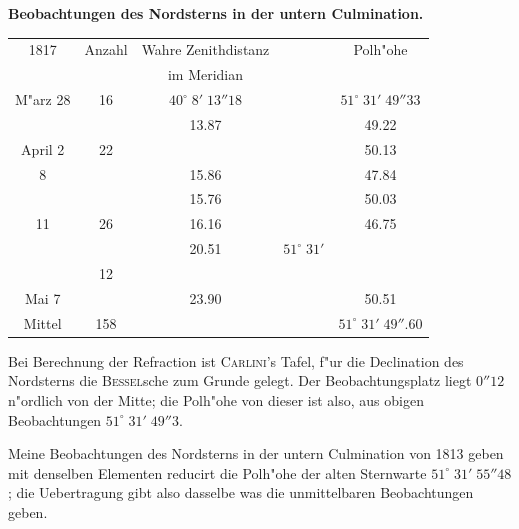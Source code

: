 \documentclass[12pt,a4paper]{article}
\begin{document}
\begin{center}
\textbf{Beobachtungen des Nordsterns in der untern Culmination.}
\end{center}

\begin{center}
\begin{tabular}{c|c|c|c|c}
\toprule
1817 & Anzahl & Wahre Zenithdistanz & & Polh"ohe \\
& & im Meridian & & \\
\midrule
M"arz 28 & 16 & $40^{\circ}\;8'\;13''18$ & & $51^{\circ}\;31'\;49''33$ \\
& & \phantom{0}\phantom{0}\phantom{0}\phantom{0}\phantom{0}13.87 & & \phantom{0}\phantom{0}\phantom{0}\phantom{0}\phantom{0}49.22 \\
April \phantom{0}2 & 22 & & & \phantom{0}\phantom{0}\phantom{0}\phantom{0}\phantom{0}50.13 \\
\phantom{0}\phantom{0}8 & & \phantom{0}\phantom{0}\phantom{0}\phantom{0}\phantom{0}15.86 & & \phantom{0}\phantom{0}\phantom{0}\phantom{0}\phantom{0}47.84 \\
& & \phantom{0}\phantom{0}\phantom{0}\phantom{0}\phantom{0}15.76 & & \phantom{0}\phantom{0}\phantom{0}\phantom{0}\phantom{0}50.03 \\
11 & 26 & \phantom{0}\phantom{0}\phantom{0}\phantom{0}\phantom{0}16.16 & & \phantom{0}\phantom{0}\phantom{0}\phantom{0}\phantom{0}46.75 \\
& & \phantom{0}\phantom{0}\phantom{0}\phantom{0}\phantom{0}20.51 & $51^{\circ}\;31'$ & \\
\phantom{0}\phantom{0} & 12 & & & \\
Mai \phantom{0}7 & & \phantom{0}\phantom{0}\phantom{0}\phantom{0}\phantom{0}23.90 & & \phantom{0}\phantom{0}\phantom{0}\phantom{0}\phantom{0}50.51 \\
\midrule
Mittel & 158 & & & $51^{\circ}\;31'\;49''.60$ \\
\bottomrule
\end{tabular}
\end{center}

Bei Berechnung der Refraction ist \textsc{Carlini}'s Tafel, f"ur die Declination des Nordsterns die \textsc{Bessel}sche
zum Grunde gelegt. Der Beobachtungsplatz liegt $0''12$ n"ordlich von der Mitte; die Polh"ohe von dieser
ist also, aus obigen Beobachtungen $51^{\circ}\;31'\;49''3$.

Meine Beobachtungen des Nordsterns in der untern Culmination von 1813 geben mit denselben
Elementen reducirt die Polh"ohe der alten Sternwarte $51^{\circ}\;31'\;55''48$; die Uebertragung gibt also
dasselbe was die unmittelbaren Beobachtungen geben.
\end{document}
